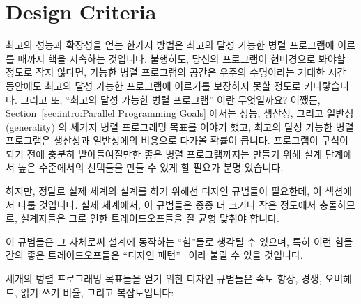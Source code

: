 
\section{Design Criteria}
\label{sec:SMPdesign:Design Criteria}

최고의 성능과 확장성을 얻는 한가지 방법은 최고의 달성 가능한 병렬 프로그램에
이르를 때까지 핵을 지속하는 것입니다.
불행히도, 당신의 프로그램이 현미경으로 봐야할 정도로 작지 않다면, 가능한 병렬
프로그램의 공간은 우주의 수명이라는 거대한 시간 동안에도 최고의 달성 가능한
프로그램에 이르기를 보장하지 못할 정도로 커다랗습니다.
그리고 또, ``최고의 달성 가능한 병렬 프로그램'' 이란 무엇일까요?
어쨌든, Section~\ref{sec:intro:Parallel Programming Goals} 에서는 성능, 생산성,
그리고 일반성 (generality) 의 세가지 병렬 프로그래밍 목표를 이야기 했고, 최고의
달성 가능한 병렬 프로그램은 생산성과 일반성에의 비용으로 다가올 확률이 큽니다.
프로그램이 구식이 되기 전에 충분히 받아들여질만한 좋은 병렬 프로그램까지는
만들기 위해 설계 단계에서 높은 수준에서의 선택들을 만들 수 있게 할 필요가 분명
있습니다.
\iffalse

One way to obtain the best performance and scalability is to simply
hack away until you converge on the best possible parallel program.
Unfortunately, if your program is other than microscopically tiny,
the space of possible parallel programs is so huge
that convergence is not guaranteed in the lifetime of the universe.
Besides, what exactly is the ``best possible parallel program''?
After all, Section~\ref{sec:intro:Parallel Programming Goals}
called out no fewer than three parallel-programming goals of
performance, productivity, and generality,
and the best possible performance will likely come at a cost in
terms of productivity and generality.
We clearly need to be able to make higher-level choices at design
time in order to arrive at an acceptably good parallel program
before that program becomes obsolete.
\fi

하지만, 정말로 실제 세계의 설계를 하기 위해선 디자인 규범들이 필요한데, 이
섹션에서 다룰 것입니다.
실제 세계에서, 이 규범들은 종종 더 크거나 작은 정도에서 충돌하므로, 설계자들은
그로 인한 트레이드오프들을 잘 균형 맞춰야 합니다.

이 규범들은 그 자체로써 설계에 동작하는 ``힘''들로 생각될 수 있으며, 특히 이런
힘들 간의 좋은 트레이드오프들은 ``디자인 패턴''~\cite{Alexander79,GOF95} 이라
불릴 수 있을 것입니다.

세개의 병렬 프로그래밍 목표들을 얻기 위한 디자인 규범들은 속도 향상, 경쟁,
오버헤드, 읽기-쓰기 비율, 그리고 복잡도입니다:
\iffalse

